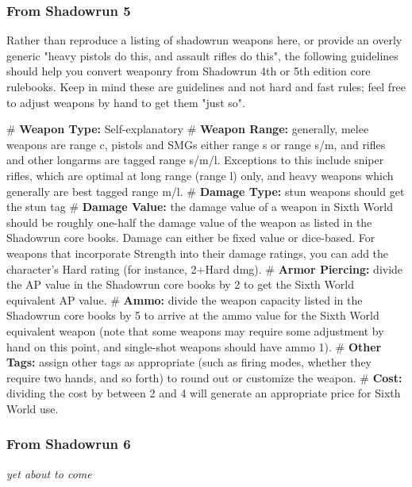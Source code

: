 \subsubsection{From Shadowrun 5}
Rather than reproduce a listing of shadowrun weapons here, or provide an overly generic "heavy pistols do this, and assault rifles do this", the following guidelines should help you convert weaponry from Shadowrun 4th or 5th edition core rulebooks. Keep in mind these are guidelines and not hard and fast rules; feel free to adjust weapons by hand to get them "just so".

\begin{easylist}
     # \textbf{Weapon Type:} Self-explanatory
     # \textbf{Weapon Range:} generally, melee weapons are range c, pistols and SMGs either range s or range s/m, and rifles and other longarms are tagged range s/m/l. Exceptions to this include  sniper rifles, which are optimal at long range (range l) only, and heavy weapons which generally are best tagged range m/l.
     # \textbf{Damage Type:} stun weapons should get the stun tag
     # \textbf{Damage Value:} the damage value of a weapon in Sixth World should be roughly one-half the damage value of the weapon as listed in the Shadowrun core books. Damage can either be fixed value or dice-based. For weapons that incorporate Strength into their damage ratings, you can add the character’s Hard rating (for instance, 2+Hard dmg).
     # \textbf{Armor Piercing:} divide the AP value in the Shadowrun core books by 2 to get the Sixth World equivalent AP value.
     # \textbf{Ammo:} divide the weapon capacity listed in the Shadowrun core books by 5 to arrive at the ammo value for the Sixth World equivalent weapon (note that some weapons may require some adjustment by hand on this point, and single-shot weapons should have ammo 1).
     # \textbf{Other Tags:} assign other tags as appropriate (such as firing modes, whether they require two hands, and so forth) to round out or customize the weapon.
     # \textbf{Cost:} dividing the cost by between 2 and 4 will generate an appropriate price for Sixth World use.
\end{easylist}


\subsubsection{From Shadowrun 6}
\textit{yet about to come}



